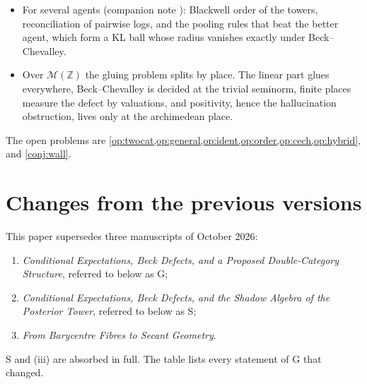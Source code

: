 \documentclass[11pt]{article}
\theoremstyle{definition}
\begin{document}
\begin{itemize}
  separate layer and stays at $\tfrac12$ at the wall. Above the wall, overlapping windows commute iff the tokens are Markov through the
  shared token, and the Friedrichs cosine is the exact measure of the coupling that no window holds.
\item For several agents (companion note \cite{PoolingNote2}): Blackwell order of the towers, reconciliation of pairwise logs, and the
  pooling rules that beat the better agent, which form a KL ball whose radius vanishes exactly under Beck--Chevalley.
\item Over $\mathcal{M}(\mathbb{Z})$ the gluing problem splits by place. The linear part glues everywhere, Beck--Chevalley is decided
  at the trivial seminorm, finite places measure the defect by valuations, and positivity, hence the hallucination obstruction, lives
  only at the archimedean place.
\end{itemize}
The open problems are \cref{op:twocat,op:general,op:ident,op:order,op:cech,op:hybrid}, and \cref{conj:wall}.

\appendix
\section{Changes from the previous versions}\label{app:changes}
This paper supersedes three manuscripts of October 2026:
\begin{enumerate}[label=(\roman*)]
\item \emph{Conditional Expectations, Beck Defects, and a Proposed Double-Category Structure}, referred to below as G;
\item \emph{Conditional Expectations, Beck Defects, and the Shadow Algebra of the Posterior Tower}, referred to below as S;
\item \emph{From Barycentre Fibres to Secant Geometry}.
\end{enumerate}
S and (iii) are absorbed in full. The table lists every statement of G that changed.
\end{document}
